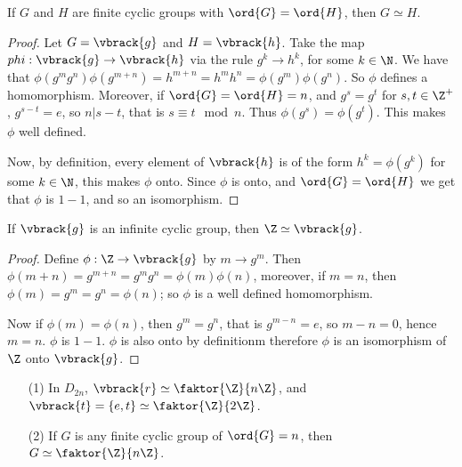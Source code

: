 \begin{theorem}\label{2.3.5}
    If $G$ and  $H$ are finite cyclic groups with  $\ord{G}=\ord{H}$, then $G
    \simeq H$.
\end{theorem}
\begin{proof}
    Let $G=\vbrack{g}$ and $H=\vbrack{h}$. Take the map $phi:\vbrack{g}
    \rightarrow \vbrack{h}$ via the rule  $g^k \rightarrow h^k$, for some $k \in
    \N$. We have that
    $\phi(g^mg^n)\phi(g^{m+n})=h^{m+n}=h^mh^n=\phi(g^m)\phi(g^n)$. So $\phi$
    defines a homomorphism. Moreover, if $\ord{G}=\ord{H}=n$, and $g^s=g^t$ for
     $s,t \in \Z^+$,  $g^{s-t}=e$, so $n|s-t$, that is  $s \equiv t \mod{n}$.
     Thus $\phi(g^s)=\phi(g^t)$. This makes $\phi$ well defined.

     Now, by definition, every element of  $\vbrack{h}$ is of the form
     $h^k=\phi(g^k)$ for some $k \in \N$, this makes  $\phi$ onto. Since  $\phi$
     is onto, and  $\ord{G}=\ord{H}$ we get that $\phi$ is  $1-1$, and so an
     isomorphism.
\end{proof}
\begin{corollary}
    If $\vbrack{g}$ is an infinite cyclic group, then $\Z \simeq \vbrack{g}$.
\end{corollary}
\begin{proof}
    Define $\phi:\Z \rightarrow \vbrack{g}$ by $m \rightarrow g^m$. Then
    $\phi(m+n)=g^{m+n}=g^mg^n=\phi(m)\phi(n)$, moreover, if $m=n$, then
    $\phi(m)=g^m=g^n=\phi(n)$; so $\phi$ is a well defined homomorphism.

    Now if  $\phi(m)=\phi(n)$, then $g^m=g^n$, that is  $g^{m-n}=e$, so $m-n=0$,
    hence  $m=n$.  $\phi$ is  $1-1$.  $\phi$ is also onto by definitionm
    therefore  $\phi$ is an isomorphism of  $\Z$ onto  $\vbrack{g}$.
\end{proof}

\begin{example}
    \begin{enumerate}
        \item[(1)] In $D_{2n}$, $\vbrack{r} \simeq \faktor{\Z}{n\Z}$, and
            $\vbrack{t}=\{e,t\} \simeq \faktor{\Z}{2\Z}$.

        \item[(2)] If $G$ is any finite cyclic group of  $\ord{G}=n$, then $G
            \simeq \faktor{\Z}{n\Z}$.
    \end{enumerate}
\end{example}

